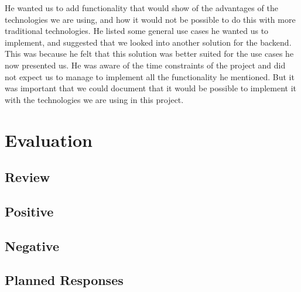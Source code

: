 He wanted us to add functionality that would show of the advantages of the technologies we are using, and how it would not be possible to do this with more traditional technologies. He listed some general use cases he wanted us to implement, and suggested that we looked into another solution for the backend. This was because he felt that this solution was better suited for the use cases he now presented us. He was aware of the time constraints of the project and did not expect us to manage to implement all the functionality he mentioned. But it was important that we could document that it would be possible to implement it with the technologies we are using in this project.


\section{Evaluation}
\subsection{Review}
\subsection{Positive}
\subsection{Negative}
\subsection{Planned Responses}
